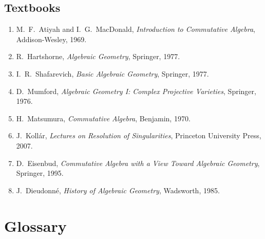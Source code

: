 \subsection*{Textbooks}
\begin{enumerate}
    \item M.\ F.\ Atiyah and I.\ G.\ MacDonald, \textit{Introduction to Commutative Algebra}, Addison-Wesley, 1969.
    \item R.\ Hartshorne, \textit{Algebraic Geometry}, Springer, 1977.
    \item I.\ R.\ Shafarevich, \textit{Basic Algebraic Geometry}, Springer, 1977.
    \item D.\ Mumford, \textit{Algebraic Geometry I: Complex Projective Varieties}, Springer, 1976.
    \item H.\ Matsumura, \textit{Commutative Algebra}, Benjamin, 1970.
    \item J.\ Koll{\'a}r, \textit{Lectures on Resolution of Singularities}, Princeton University Press, 2007.
    \item D.\ Eisenbud, \textit{Commutative Algebra with a View Toward Algebraic Geometry}, Springer, 1995.
    \item J.\ Dieudonn{\'e}, \textit{History of Algebraic Geometry}, Wadsworth, 1985.
\end{enumerate}

\section*{Glossary}

